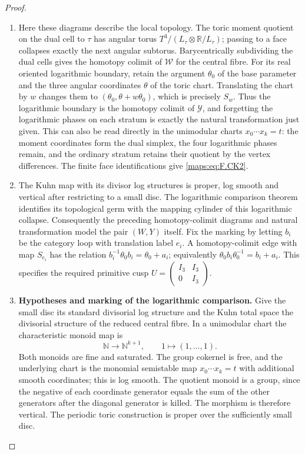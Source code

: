 \documentclass[11pt,a4paper]{article}
\numberwithin{equation}{section}
\theoremstyle{definition}
\begin{document}
\begin{proof}
\begin{enumerate}[label=\arabic*.]
\item Here these diagrams describe the local topology.
The toric moment quotient on the dual cell to $\tau$ has
angular torus $T^3/(L_\tau\otimes\mathbb R/L_\tau)$;
passing to a face collapses exactly the next angular
subtorus.  Barycentrically subdividing the dual cells gives
the homotopy colimit of $\mathcal W$ for the central fibre.
For its real oriented logarithmic boundary, retain the
argument $\theta_0$ of the base parameter and the three
angular coordinates $\theta$ of the toric chart.  Translating
the chart by $w$ changes them to
$(\theta_0,\theta+w\theta_0)$, which is precisely $S_w$.
Thus the logarithmic boundary is the homotopy colimit of
$\mathcal Y$, and forgetting the logarithmic phases on each
stratum is exactly the natural transformation just given.
This can also be read directly in the unimodular charts
$x_0\cdots x_k=t$: the moment coordinates form the dual
simplex, the four logarithmic phases remain, and the ordinary
stratum retains their quotient by the vertex differences.
The finite face identifications give \eqref{maps:eq:F.CK2}.

\item The Kuhn map with its divisor log structures is proper,
log smooth and vertical after restricting to a small disc.
The logarithmic comparison theorem \cite[Theorem 4.1.1 and Lemmas 4.1.2--4.1.3, pp.~480--482]{ffAchingerOgus20} identifies its topological germ with the mapping cylinder of this logarithmic collapse.  Consequently the preceding
homotopy-colimit diagrams and natural transformation model
the pair $(W,Y)$ itself.  Fix the marking by letting $b_i$
be the category loop with translation label $e_i$.  A
homotopy-colimit edge with map $S_{e_i}$ has the relation
$b_i^{-1}\theta_0b_i=\theta_0+a_i$; equivalently
$\theta_0b_i\theta_0^{-1}=b_i+a_i$.  This specifies the
required primitive cusp
$U=\begin{pmatrix}I_3&I_3\\0&I_3\end{pmatrix}$.

\item \par\medskip\noindent\textbf{Hypotheses and marking of the logarithmic comparison.}\quad 
\hypertarget{tag-02J2}{}\label{maps:mapsF:repair:log-cylinder-scope}
Give the small disc its standard divisorial log structure and
the Kuhn total space the divisorial structure of the reduced
central fibre.  In a unimodular chart the characteristic
monoid map is
\[
 \mathbb N\longrightarrow\mathbb N^{k+1},\qquad
 1\longmapsto(1,\ldots,1).
\]
Both monoids are fine and saturated.  The group cokernel is
free, and the underlying chart is the monomial semistable
map $x_0\cdots x_k=t$ with additional smooth coordinates;
this is log smooth.  The quotient monoid is a group, since
the negative of each coordinate generator equals the sum of
the other generators after the diagonal generator is killed.
The morphism is therefore vertical.  The periodic toric
construction is proper over the sufficiently small disc.


\end{enumerate}
\end{proof}
\end{document}
